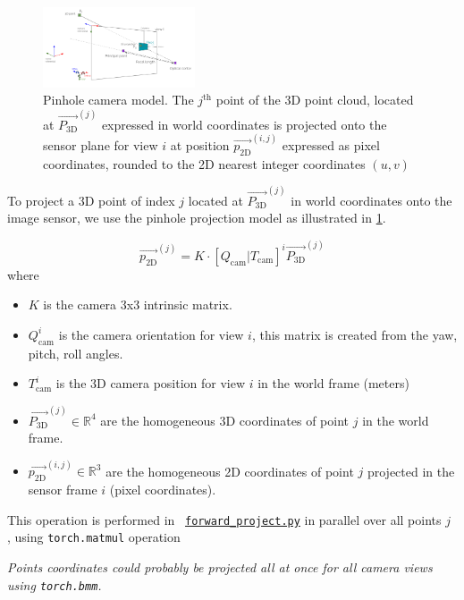 \begin{figure}[H]
    \centering
    \includegraphics[width=0.4\textwidth]{figures/pinhole_camera_with_angles.png}
    \caption{Pinhole camera model. The $j^\text{th}$ point of the 3D point cloud, located at $\vec{P_{\textrm{3D}}}^{(j)}$ expressed in world coordinates is projected onto the sensor plane for view $i$ at position $\vec{p_{\textrm{2D}}}^{(i,j)}$ expressed as pixel coordinates, rounded to the 2D nearest integer coordinates $(u,v)$}
    \label{fig:pinhole_camera}
\end{figure}


To project a 3D point of index $j$ located at $\vec{P_{\textrm{3D}}}^{(j)}$ in world coordinates onto the image sensor,
we use the pinhole projection model as illustrated in \ref{fig:pinhole_camera}.

$$\vec{p_{\textrm{2D}}}^{(j)} = K\cdot\left[Q_{\text{cam}} | T_{\text{cam}}\right]^{i}\vec{P_{\textrm{3D}}}^{(j)}$$
where
\begin{itemize}
    \item $K$ is the camera 3x3 intrinsic matrix.
    \item $Q_{\textrm{cam}}^{i}$ is the camera orientation for view $i$, this matrix is created from the yaw, pitch, roll angles.
    \item $T_{\textrm{cam}}^{i}$ is the 3D camera position for view $i$ in the world frame (meters)
    \item $\vec{P_{\textrm{3D}}}^{(j)} \in \mathbb{R}^{4}$ are the homogeneous 3D coordinates of point $j$ in the world frame.
    \item $\vec{p_{\textrm{2D}}}^{(i,j)} \in \mathbb{R}^{3}$ are the homogeneous 2D coordinates of point $j$ projected in the sensor frame $i$ (pixel coordinates).
\end{itemize}

This operation is performed in ~\href{https://github.com/balthazarneveu/per-pixel-point-rendering/blob/main/src/pixr/rendering/forward_project.py}{\texttt{forward\_project.py}} in parallel over all points $j$ , using \texttt{torch.matmul} operation

\noindent \textit{Points coordinates could probably be projected all at once for all camera views using \texttt{torch.bmm}.}


